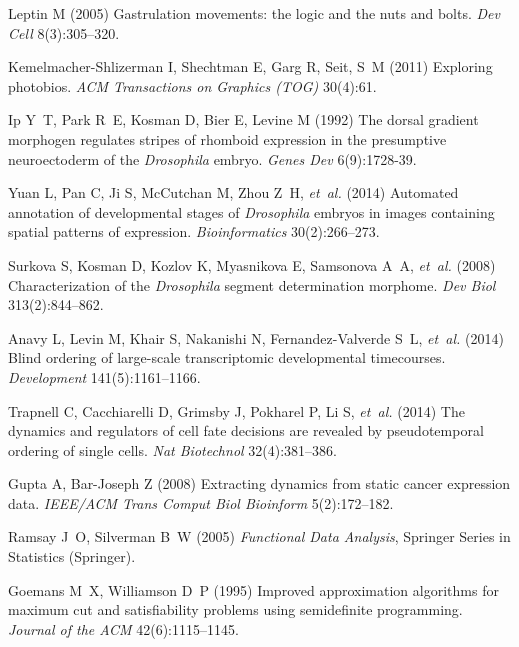 \documentclass{pnastwo}
\begin{document}
\begin{article}
\begin{thebibliography}{10}
Leptin M (2005) Gastrulation movements: the logic and the nuts and bolts.
  \textit{Dev Cell} 8(3):305--320.

Kemelmacher-Shlizerman I, Shechtman E, Garg R, Seit, S~M (2011)
Exploring photobios. \textit{ACM Transactions on Graphics (TOG)} 30(4):61.

Ip Y~T, Park R~E, Kosman D, Bier E, Levine M (1992) 
The dorsal gradient morphogen regulates stripes of rhomboid expression in the presumptive neuroectoderm of the \textit{Drosophila} embryo. \textit{Genes Dev} 6(9):1728-39.

Yuan L, Pan C, Ji S, McCutchan M, Zhou Z~H, \textit{et~al.} (2014) Automated
  annotation of developmental stages of \textit{{D}rosophila} embryos in images
  containing spatial patterns of expression. \textit{Bioinformatics}
  30(2):266--273.

Surkova S, Kosman D, Kozlov K, Myasnikova E, Samsonova A~A, \textit{et~al.}
  (2008) Characterization of the \textit{{D}rosophila} segment determination
  morphome. \textit{Dev Biol} 313(2):844--862.

Anavy L, Levin M, Khair S, Nakanishi N, Fernandez-Valverde S~L, \textit{et~al.}
  (2014) Blind ordering of large-scale transcriptomic developmental
  timecourses. \textit{Development} 141(5):1161--1166.

Trapnell C, Cacchiarelli D, Grimsby J, Pokharel P, Li S, \textit{et~al.} (2014)
  The dynamics and regulators of cell fate decisions are revealed by
  pseudotemporal ordering of single cells. \textit{Nat Biotechnol} 32(4):381--386.

Gupta A, Bar-Joseph Z (2008) Extracting dynamics from static cancer expression
  data. \textit{IEEE/ACM Trans Comput Biol Bioinform} 5(2):172--182.


Ramsay J~O, Silverman B~W (2005) \textit{Functional Data Analysis}, Springer
  Series in Statistics (Springer).

Goemans M~X, Williamson D~P (1995) Improved approximation algorithms for maximum cut and satisfiability problems using semidefinite programming.
\textit{Journal of the ACM} 42(6):1115--1145.


\end{thebibliography}
\end{article}
\end{document}
